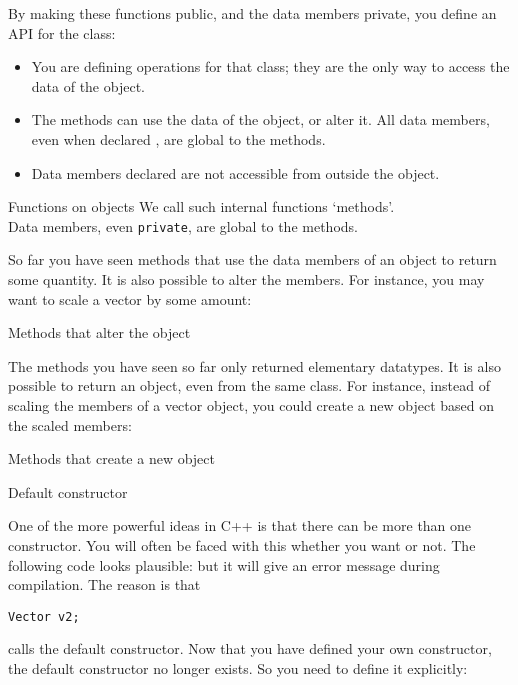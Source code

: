 By making these functions public, and the data members
private, you define an \acf{API} for the class:
\begin{itemize}
\item You are defining operations for that class; they are the only
  way to access the data of the object.
\item The methods can use the data of the object, or alter it. All
  data members, even when declared , are global to the methods.
\item  Data members declared  are not accessible from outside the
  object.
\end{itemize}

\begin{slide}{Functions on objects}
  \label{sl:obj-func}
  We call such internal functions `methods'.\\
  Data members, even \lstinline{private}, are global to the methods.
\end{slide}

So far you have seen methods that use the data members of an object to
return some quantity. It is also possible to alter the members. 
For instance, you may want to scale a vector by some amount:
%

\begin{slide}{Methods that alter the object}
  \label{sl:obj-func-on}
\end{slide}

The methods you have seen so far only returned elementary
datatypes. It is also possible to return an object, even from the same
class. For instance, instead of scaling the members of a vector object, you
could create a new object based on the scaled members:
%

\begin{slide}{Methods that create a new object}
  \label{sl:obj-return}
\end{slide}

 {Default constructor}

One of the more powerful ideas in C++ is that there can be more than
one constructor. You will often be faced with this whether you want or
not. The following code looks plausible:
%
%
but it will give an error message during compilation. The reason is
that 
\begin{lstlisting}
Vector v2;
\end{lstlisting}
calls the default constructor. Now that you have defined your own
constructor, the default constructor no longer exists. So you need to
define it explicitly:
%

